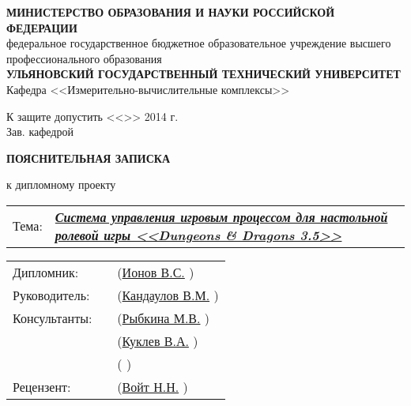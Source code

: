 \begin{titlepage}



\small
\begin{center}

\MakeTextUppercase{\textbf{министерство образования и науки российской федерации}}\\
федеральное государственное бюджетное образовательное учреждение высшего профессионального образования\\
\MakeTextUppercase{\textbf{ульяновский государственный технический университет}}\\[0.7cm]

Кафедра <<Измерительно-вычислительные комплексы>>\\[0.7cm]

\begin{flushright}

К защите допустить <<\underline{\hspace{1cm}}>>\underline{\hspace{2.5cm}} 2014 г.\\
Зав. кафедрой \underline{\hspace{3.5cm}}

\end{flushright}

\vspace{1.5cm}

\LARGE

\textbf{ПОЯСНИТЕЛЬНАЯ ЗАПИСКА}

\Large

к дипломному проекту\\[0.7cm]

\normalsize

\begin{tabular}{p{1cm} p{13.5cm}}
Тема: & \textbf{\textit{\uline{Система управления игровым процессом для настольной ролевой игры <<Dungeons \& Dragons 3.5>>\hfill}}}
\end{tabular}

\vspace{2cm}

\begin{tabular}{m{3cm} m{6cm} m{5cm}}
    Дипломник:    & \uline{\hfill} & (\uline{Ионов В.С.\hfill}     )  \\[0.5cm]
    Руководитель: & \uline{\hfill} & (\uline{Кандаулов В.М.\hfill} )  \\[0.5cm]
    Консультанты: & \uline{\hfill} & (\uline{Рыбкина М.В.\hfill}   )  \\[0.5cm]
                  & \uline{\hfill} & (\uline{Куклев В.А.\hfill}    )  \\[0.5cm]
                  & \uline{\hfill} & (\uline{\hfill}               )  \\[0.5cm]
    Рецензент:    & \uline{\hfill} & (\uline{Войт Н.Н.\hfill}      )  \\
\end{tabular}


\end{center}
\end{titlepage}
